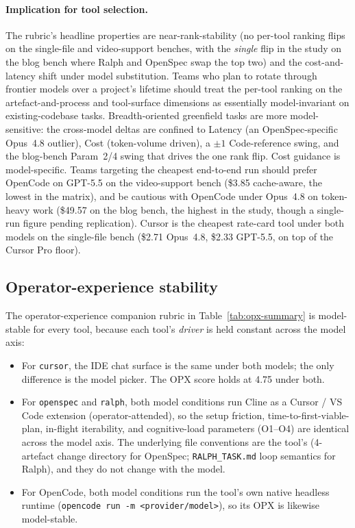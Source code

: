 \paragraph{Implication for tool selection.} The rubric's headline
properties are near-rank-stability (no per-tool ranking flips on the
single-file and video-support benches, with the \emph{single} flip in the study
on the blog bench where Ralph and OpenSpec swap the top two) and
the cost-and-latency shift under model substitution. Teams who plan to
rotate through frontier models over a project's lifetime should treat
the per-tool ranking on the artefact-and-process and tool-surface
dimensions as essentially model-invariant on existing-codebase tasks.
Breadth-oriented greenfield tasks are more model-sensitive: the
cross-model deltas are confined to Latency (an OpenSpec-specific
Opus~4.8 outlier), Cost (token-volume driven), a $\pm1$ Code-reference
swing, and the blog-bench Param~2/4 swing that drives the one rank flip.
Cost guidance is model-specific. Teams targeting the cheapest end-to-end
run should prefer OpenCode on GPT-5.5 on the video-support bench
(\$3.85 cache-aware, the lowest in the matrix), and be cautious with
OpenCode under Opus~4.8 on token-heavy work (\$49.57 on the blog bench,
the highest in the study, though a single-run figure pending
replication). Cursor is the cheapest rate-card tool under both models on
the single-file bench (\$2.71 Opus~4.8, \$2.33 GPT-5.5, on top of the
Cursor Pro floor).

\subsection{Operator-experience stability}

The operator-experience companion rubric in Table~\ref{tab:opx-summary}
is model-stable for every tool, because each tool's \emph{driver} is
held constant across the model axis:

\begin{itemize}
\item For \texttt{cursor}, the IDE chat surface is the same under
both models; the only difference is the model picker. The OPX score
holds at 4.75 under both.
\item For \texttt{openspec} and \texttt{ralph}, both model conditions
run Cline as a Cursor / VS Code extension (operator-attended), so the
setup friction, time-to-first-viable-plan, in-flight iterability, and
cognitive-load parameters (O1--O4) are identical across the model
axis. The underlying file conventions are the tool's (4-artefact
change directory for OpenSpec; \texttt{RALPH\_TASK.md} loop semantics
for Ralph), and they do not change with the model.
\item For OpenCode, both model conditions run the tool's own native
headless runtime (\texttt{opencode run -m <provider/model>}), so its
OPX is likewise model-stable.
\end{itemize}

